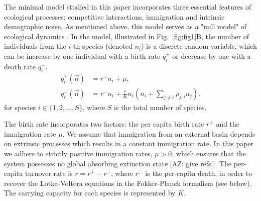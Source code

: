 \documentclass[9pt,twocolumn,twoside,lineno]{pnas-new}
\begin{document}
The minimal model studied in this paper incorporates three essential features of ecological processes: competitive interactions, immigration and intrinsic demographic noise. As mentioned above, %
this model serves as a "null model" of  ecological dynamics \cite{black2012stochastic}.
In the model, illustrated  in Fig.~\ref{fig:fig1}B, the number of individuals from the $i$-th species (denoted $n_i$) is a discrete random variable, which can be increase by one individual with a birth rate $q^+_i$  or decrease by one with a death rate $q^-_i$. %
\begin{align}
q_i^+(\vec{n})&=r^+ n_i +\mu,  \\
q_i^-(\vec{n})&=r^- n_i + \frac{r}{K} n_i \left(n_i +\sum_{j\neq i} \rho _{j,i} n_j\right). \nonumber
\end{align}
for species $i\in \{1,2,\dots,S\}$, where $S$ is the total number of species.

The birth rate incorporates two factors: the per capita birth rate $r^+$ and the immigration rate $\mu$.
We assume that immigration from an external basin depends on extrinsic processes which results in a constant immigration rate.
In this paper we adhere to strictly positive immigration rates, $\mu > 0$, which ensures that the system possesses no global absorbing extinction state [AZ: give refs]]. 
The per-capita turnover rate is $r=r^+-r^-$, where $r^-$ is the per-capita death, in order to recover the Lotka-Voltera equations in the Fokker-Planck formalism (see below).
The carrying capacity for each species is represented by $K$.
\end{document}
